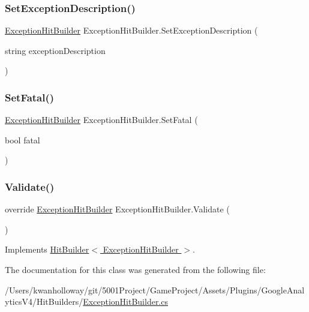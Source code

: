 \subsubsection{\texorpdfstring{Set\+Exception\+Description()}{SetExceptionDescription()}}
{\footnotesize\ttfamily \hyperlink{class_exception_hit_builder}{Exception\+Hit\+Builder} Exception\+Hit\+Builder.\+Set\+Exception\+Description (\begin{DoxyParamCaption}\item[{string}]{exception\+Description }\end{DoxyParamCaption})}

\mbox{\label{class_exception_hit_builder_accb6cad07101272600170b3821e4efd4}} 
\subsubsection{\texorpdfstring{Set\+Fatal()}{SetFatal()}}
{\footnotesize\ttfamily \hyperlink{class_exception_hit_builder}{Exception\+Hit\+Builder} Exception\+Hit\+Builder.\+Set\+Fatal (\begin{DoxyParamCaption}\item[{bool}]{fatal }\end{DoxyParamCaption})}

\mbox{\label{class_exception_hit_builder_a92267f29b56b25eecdb6830f3489bace}} 
\subsubsection{\texorpdfstring{Validate()}{Validate()}}
{\footnotesize\ttfamily override \hyperlink{class_exception_hit_builder}{Exception\+Hit\+Builder} Exception\+Hit\+Builder.\+Validate (\begin{DoxyParamCaption}{ }\end{DoxyParamCaption})\hspace{0.3cm}{\ttfamily [virtual]}}



Implements \hyperlink{class_hit_builder_a0f4833828bd530bb057c9ca359584bce}{Hit\+Builder$<$ Exception\+Hit\+Builder $>$}.



The documentation for this class was generated from the following file\+:\begin{DoxyCompactItemize}
\item 
/\+Users/kwanholloway/git/5001\+Project/\+Game\+Project/\+Assets/\+Plugins/\+Google\+Analytics\+V4/\+Hit\+Builders/\hyperlink{_exception_hit_builder_8cs}{Exception\+Hit\+Builder.\+cs}\end{DoxyCompactItemize}

